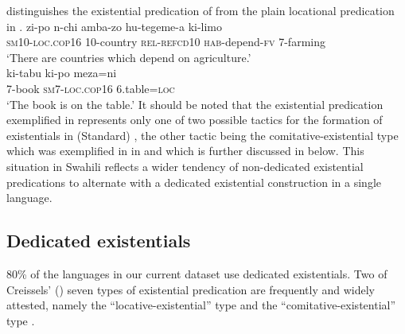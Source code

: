 \documentclass[output=paper]{langsci/langscibook}
\begin{document}
distinguishes the existential predication of 
from the plain locational predication in .
\ea\label{ex:swahili-agriculture-table}
\ea\label{ex:swahili-agriculture}
\gll zi-po n-chi amba-zo hu-tegeme-a ki-limo\\
     \textsc{sm}10-\textsc{loc.cop}16 10-country \textsc{rel-refcd}10 \textsc{hab}-depend-\textsc{fv} 7-farming\\
\glt `There are countries which depend on agriculture.'\\
\ex\label{ex:swahili-table}
\gll ki-tabu ki-po meza=ni\\
	7-book \textsc{sm7-loc.cop16} 6.table=\textsc{loc}\\
\glt `The book is on the table.'
\z\z
It should be noted that the existential predication exemplified in
 represents only one of two possible tactics
for the formation of existentials in (Standard) , the other tactic being the comitative-existential type which was exemplified in  in  and which is further discussed in  below. This situation in Swahili reflects a wider tendency of non-dedicated existential predications to alternate with a dedicated existential construction in a single language. 

\subsection{Dedicated existentials}\label{sec:1:3.2}
80\% of the languages in our current dataset use dedicated existentials. Two of Creissels' (\citeyear{Creissels2014,Creissels2015}) seven types of existential predication are frequently and widely attested, namely the ``locative-existential'' type and the ``comitative-existential'' type \citep{BernanderDevos2018}.
\end{document}
